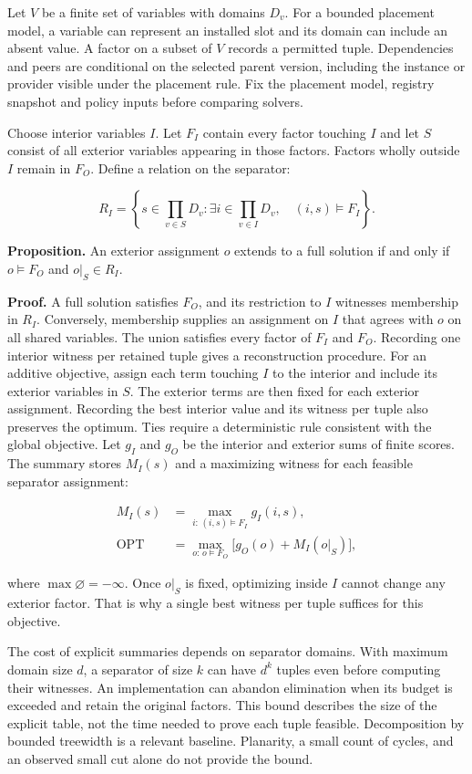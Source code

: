\documentclass[
  11pt,
  letterpaper,
]{article}
\begin{document}
Let \(V\) be a finite set of variables with domains \(D_v\). For a
bounded placement model, a variable can represent an installed slot and
its domain can include an absent value. A factor on a subset of \(V\)
records a permitted tuple. Dependencies and peers are conditional on the
selected parent version, including the instance or provider visible
under the placement rule. Fix the placement model, registry snapshot and
policy inputs before comparing solvers.

Choose interior variables \(I\). Let \(F_I\) contain every factor
touching \(I\) and let \(S\) consist of all exterior variables appearing
in those factors. Factors wholly outside \(I\) remain in \(F_O\). Define
a relation on the separator:

\[R_I = \left\{ s \in \prod_{v \in S}D_v :
     \exists i \in \prod_{v\in I}D_v,\quad (i,s) \models F_I \right\}.\]

\textbf{Proposition.} An exterior assignment \(o\) extends to a full
solution if and only if \(o \models F_O\) and \(o|_S \in R_I\).

\textbf{Proof.} A full solution satisfies \(F_O\), and its restriction
to \(I\) witnesses membership in \(R_I\). Conversely, membership
supplies an assignment on \(I\) that agrees with \(o\) on all shared
variables. The union satisfies every factor of \(F_I\) and \(F_O\).
Recording one interior witness per retained tuple gives a reconstruction
procedure. For an additive objective, assign each term touching \(I\) to
the interior and include its exterior variables in \(S\). The exterior
terms are then fixed for each exterior assignment. Recording the best
interior value and its witness per tuple also preserves the optimum.
Ties require a deterministic rule consistent with the global objective.
Let \(g_I\) and \(g_O\) be the interior and exterior sums of finite
scores. The summary stores \(M_I(s)\) and a maximizing witness for each
feasible separator assignment:

\[\begin{aligned}
M_I(s) &= \max_{i:\,(i,s)\models F_I} g_I(i,s),\\
\mathrm{OPT} &= \max_{o:\,o\models F_O} \bigl[g_O(o)+M_I(o|_S)\bigr],
\end{aligned}\]

where \(\max\varnothing=-\infty\). Once \(o|_S\) is fixed, optimizing
inside \(I\) cannot change any exterior factor. That is why a single
best witness per tuple suffices for this objective.

The cost of explicit summaries depends on separator domains. With
maximum domain size \(d\), a separator of size \(k\) can have \(d^k\)
tuples even before computing their witnesses. An implementation can
abandon elimination when its budget is exceeded and retain the original
factors. This bound describes the size of the explicit table, not the
time needed to prove each tuple feasible. Decomposition by bounded
treewidth is a relevant baseline. Planarity, a small count of cycles,
and an observed small cut alone do not provide the bound.
\end{document}
